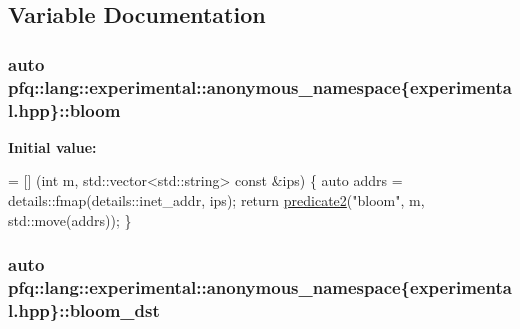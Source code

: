 \subsection{Variable Documentation}
\hypertarget{namespacepfq_1_1lang_1_1experimental_1_1anonymous__namespace_02experimental_8hpp_03_a47efdb4619749db417f27b4ec9090c88}{
\subsubsection[{bloom}]{\setlength{\rightskip}{0pt plus 5cm}auto pfq\+::lang\+::experimental\+::anonymous\+\_\+namespace\{experimental.\+hpp\}\+::bloom}}\label{namespacepfq_1_1lang_1_1experimental_1_1anonymous__namespace_02experimental_8hpp_03_a47efdb4619749db417f27b4ec9090c88}
{\bfseries Initial value\+:}
\begin{DoxyCode}
= [] (\textcolor{keywordtype}{int} m, std::vector<std::string> \textcolor{keyword}{const} &ips) \{
                                \textcolor{keyword}{auto} addrs = details::fmap(details::inet\_addr, ips);
                                \textcolor{keywordflow}{return} \hyperlink{namespacepfq_1_1lang_a7282b9a2e51359b8db0dcdb9fadf2fd1}{predicate2}(\textcolor{stringliteral}{"bloom"}, m, std::move(addrs));
                          \}
\end{DoxyCode}
\hypertarget{namespacepfq_1_1lang_1_1experimental_1_1anonymous__namespace_02experimental_8hpp_03_a77e8efb950d2c9158cdcf00bce24bf1a}{
\subsubsection[{bloom\+\_\+dst}]{\setlength{\rightskip}{0pt plus 5cm}auto pfq\+::lang\+::experimental\+::anonymous\+\_\+namespace\{experimental.\+hpp\}\+::bloom\+\_\+dst}}\label{namespacepfq_1_1lang_1_1experimental_1_1anonymous__namespace_02experimental_8hpp_03_a77e8efb950d2c9158cdcf00bce24bf1a}
